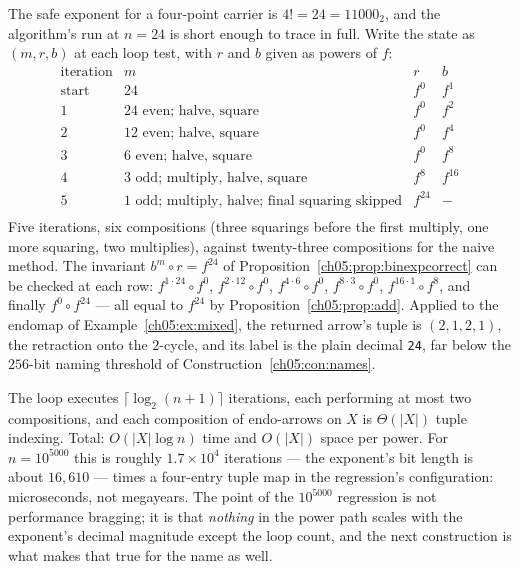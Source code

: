 \begin{example}[Trace at $n = 24$]
\label{ch05:ex:trace}
The safe exponent for a four-point carrier is $4! = 24 = 11000_2$, and the
algorithm's run at $n = 24$ is short enough to trace in full. Write the
state as $(m, r, b)$ at each loop test, with $r$ and $b$ given as powers
of $f$:
\[
\begin{array}{llll}
\text{iteration} & m & r & b \\
\text{start} & 24 & f^{0} & f^{1} \\
1 & 24 \text{ even; halve, square} & f^{0} & f^{2} \\
2 & 12 \text{ even; halve, square} & f^{0} & f^{4} \\
3 & 6 \text{ even; halve, square} & f^{0} & f^{8} \\
4 & 3 \text{ odd; multiply, halve, square} & f^{8} & f^{16} \\
5 & 1 \text{ odd; multiply, halve; final squaring skipped} & f^{24} & - \\
\end{array}
\]
Five iterations, six compositions (three squarings before the first
multiply, one more squaring, two multiplies), against twenty-three
compositions for the naive method. The invariant
$b^{m} \circ r = f^{24}$ of
Proposition~\ref{ch05:prop:binexpcorrect} can be checked at each row:
$f^{1 \cdot 24} \circ f^{0}$, $f^{2 \cdot 12} \circ f^{0}$,
$f^{4 \cdot 6} \circ f^{0}$, $f^{8 \cdot 3} \circ f^{0}$,
$f^{16 \cdot 1} \circ f^{8}$, and finally $f^{0} \circ f^{24}$ --- all
equal to $f^{24}$ by Proposition~\ref{ch05:prop:add}. Applied to the
endomap of Example~\ref{ch05:ex:mixed}, the returned arrow's tuple is
$(2, 1, 2, 1)$, the retraction onto the $2$-cycle, and its label is the
plain decimal \texttt{24}, far below the $256$-bit naming threshold of
Construction~\ref{ch05:con:names}.
\end{example}

\begin{remark}[Cost]
\label{ch05:rem:cost}
The loop executes $\lceil \log_2(n + 1) \rceil$ iterations, each performing
at most two compositions, and each composition of endo-arrows on $X$ is
$\Theta(|X|)$ tuple indexing. Total: $O(|X| \log n)$ time and $O(|X|)$
space per power. For $n = 10^{5000}$ this is roughly $1.7 \times 10^{4}$
iterations --- the exponent's bit length is about $16{,}610$ --- times a
four-entry tuple map in the regression's configuration: microseconds, not
megayears. The point of the $10^{5000}$ regression is not performance
bragging; it is that \emph{nothing} in the power path scales with the
exponent's decimal magnitude except the loop count, and the next
construction is what makes that true for the name as well.
\end{remark}

